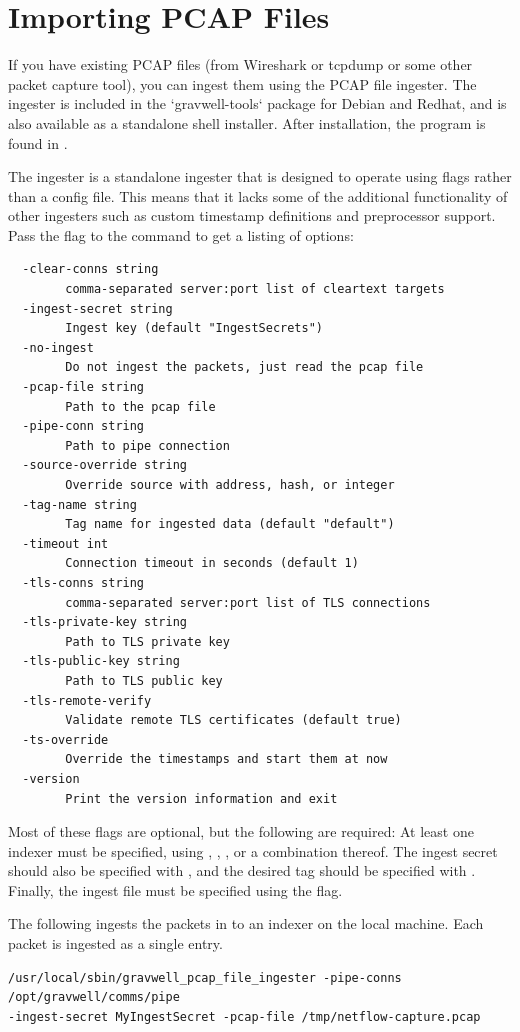 \section{Importing PCAP Files}
If you have existing PCAP files (from Wireshark or tcpdump or some other packet capture tool), you can ingest them using the PCAP file ingester.  The ingester is included in the `gravwell-tools` package for Debian and Redhat, and is also available as a standalone shell installer. After installation, the program is found in .

The ingester is a standalone ingester that is designed to operate using flags rather than a config file.  This means that it lacks some of the additional functionality of other ingesters such as custom timestamp definitions and preprocessor support.  Pass the  flag to the command to get a listing of options:

\begin{verbatim}
  -clear-conns string
    	comma-separated server:port list of cleartext targets
  -ingest-secret string
    	Ingest key (default "IngestSecrets")
  -no-ingest
    	Do not ingest the packets, just read the pcap file
  -pcap-file string
    	Path to the pcap file
  -pipe-conn string
    	Path to pipe connection
  -source-override string
    	Override source with address, hash, or integer
  -tag-name string
    	Tag name for ingested data (default "default")
  -timeout int
    	Connection timeout in seconds (default 1)
  -tls-conns string
    	comma-separated server:port list of TLS connections
  -tls-private-key string
    	Path to TLS private key
  -tls-public-key string
    	Path to TLS public key
  -tls-remote-verify
    	Validate remote TLS certificates (default true)
  -ts-override
    	Override the timestamps and start them at now
  -version
    	Print the version information and exit
\end{verbatim}

Most of these flags are optional, but the following are required: At least one indexer must be specified, using , , , or a combination thereof. The ingest secret should also be specified with , and the desired tag should be specified with . Finally, the ingest file must be specified using the  flag.

The following ingests the packets in  to an indexer on the local machine. Each packet is ingested as a single entry.

\begin{verbatim}
/usr/local/sbin/gravwell_pcap_file_ingester -pipe-conns /opt/gravwell/comms/pipe 
-ingest-secret MyIngestSecret -pcap-file /tmp/netflow-capture.pcap
\end{verbatim}


